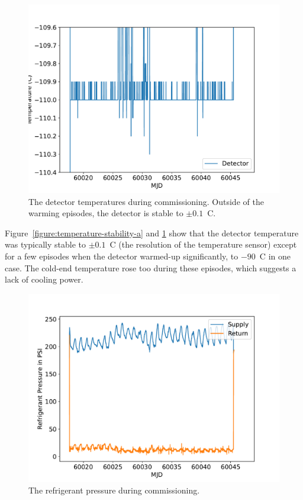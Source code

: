 \documentclass{article}
\begin{document}
\begin{figure}[pb]
\begin{center}
\includegraphics[width=0.7\columnwidth]{figures/temperature-stability-b.pdf}
\medskip
\caption{The detector temperatures during commissioning. Outside of the warming episodes, the detector is stable to $\pm0.1$~C.}
\label{figure:temperature-stability-b}
\end{center}
\end{figure}

Figure~\ref{figure:temperature-stability-a} and \ref{figure:temperature-stability-b} show that the detector temperature was typically stable to $\pm0.1$~C (the resolution of the temperature sensor) except for a few episodes when the detector warmed-up significantly, to $-90$~C in one case. The cold-end temperature rose too during these episodes, which suggests a lack of cooling power.

\begin{figure}[pb]
\begin{center}
\includegraphics[width=0.7\columnwidth]{figures/refrigerant-pressure.pdf}
\medskip
\caption{The refrigerant pressure during commissioning.}
\label{figure:refrigerant-pressure}
\end{center}
\end{figure}
\end{document}

